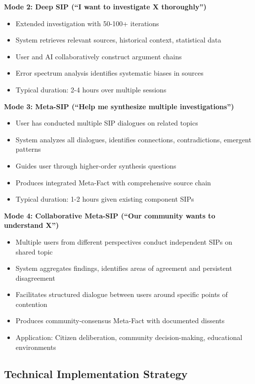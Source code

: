 \documentclass[11pt,a4paper]{article}
\begin{document}
\begin{small}
\textbf{Mode 2: Deep SIP (``I want to investigate X thoroughly'')}
\begin{itemize}[nosep]
    \item Extended investigation with 50-100+ iterations
    \item System retrieves relevant sources, historical context, statistical data
    \item User and AI collaboratively construct argument chains
    \item Error spectrum analysis identifies systematic biases in sources
    \item Typical duration: 2-4 hours over multiple sessions
\end{itemize}

\textbf{Mode 3: Meta-SIP (``Help me synthesize multiple investigations'')}
\begin{itemize}[nosep]
    \item User has conducted multiple SIP dialogues on related topics
    \item System analyzes all dialogues, identifies connections, contradictions, emergent patterns
    \item Guides user through higher-order synthesis questions
    \item Produces integrated Meta-Fact with comprehensive source chain
    \item Typical duration: 1-2 hours given existing component SIPs
\end{itemize}

\textbf{Mode 4: Collaborative Meta-SIP (``Our community wants to understand X'')}
\begin{itemize}[nosep]
    \item Multiple users from different perspectives conduct independent SIPs on shared topic
    \item System aggregates findings, identifies areas of agreement and persistent disagreement
    \item Facilitates structured dialogue between users around specific points of contention
    \item Produces community-consensus Meta-Fact with documented dissents
    \item Application: Citizen deliberation, community decision-making, educational environments
\end{itemize}

\subsection{Technical Implementation Strategy}


\end{small}
\end{document}
